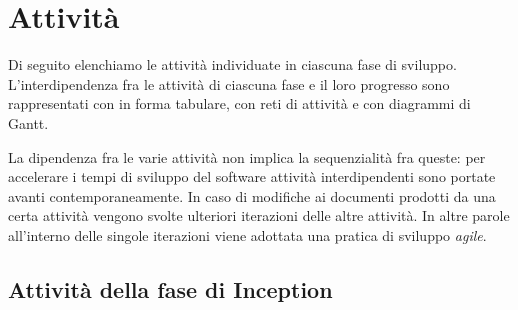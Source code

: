 \section{Attivit\`a}

Di seguito elenchiamo le attivit\`a individuate in ciascuna fase di sviluppo.
L'interdipendenza fra le attivit\`a di ciascuna fase e il loro progresso sono rappresentati con in forma tabulare, con reti di attivit\`a e con diagrammi di Gantt.

La dipendenza fra le varie attivit\`a non implica la sequenzialit\`a fra queste: per accelerare i tempi di sviluppo del software attivit\`a interdipendenti sono portate avanti contemporaneamente.
In caso di modifiche ai documenti prodotti da una certa attivit\`a vengono svolte ulteriori iterazioni delle altre attivit\`a.
In altre parole all'interno delle singole iterazioni viene adottata una pratica di sviluppo \emph{agile}.

\subsection{Attivit\`a della fase di Inception}

